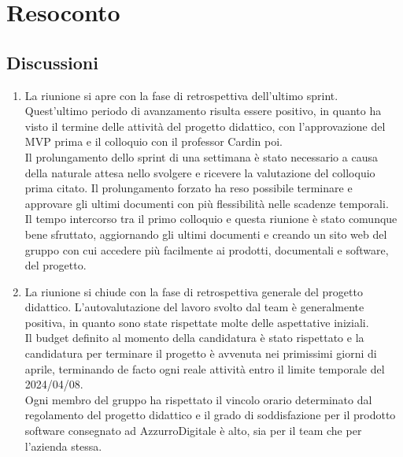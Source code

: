 \section{Resoconto} \label{sec:resoconto}
\subsection{Discussioni} \label{subsec:resdiscussione}
\begin{enumerate}
    \item La riunione si apre con la fase di retrospettiva dell'ultimo sprint. Quest'ultimo periodo di avanzamento risulta essere positivo, in quanto ha visto il termine delle attività del progetto didattico, con l'approvazione del MVP prima e il colloquio con il professor Cardin poi.\\
    Il prolungamento dello sprint di una settimana è stato necessario a causa della naturale attesa nello svolgere e ricevere la valutazione del colloquio prima citato. Il prolungamento forzato ha reso possibile terminare e approvare gli ultimi documenti con più flessibilità nelle scadenze temporali.\\
    Il tempo intercorso tra il primo colloquio e questa riunione è stato comunque bene sfruttato, aggiornando gli ultimi documenti e creando un sito web del gruppo con cui accedere più facilmente ai prodotti, documentali e software, del progetto.
    \item La riunione si chiude con la fase di retrospettiva generale del progetto didattico. L'autovalutazione del lavoro svolto dal team è generalmente positiva, in quanto sono state rispettate molte delle aspettative iniziali.\\
    Il budget definito al momento della candidatura è stato rispettato e la candidatura per terminare il progetto è avvenuta nei primissimi giorni di aprile, terminando de facto ogni reale attività entro il limite temporale del 2024/04/08.\\
    Ogni membro del gruppo ha rispettato il vincolo orario determinato dal regolamento del progetto didattico e il grado di soddisfazione per il prodotto software consegnato ad AzzurroDigitale è alto, sia per il team che per l'azienda stessa.
\end{enumerate}

